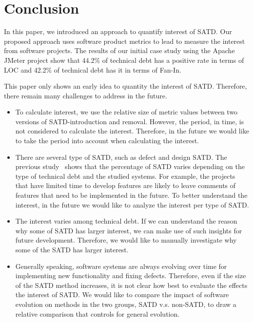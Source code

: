 \section{Conclusion} \label{conclusion}
%
In this paper, we introduced an approach to quantify interest of SATD. Our proposed approach uses
software product metrics to lead to measure the interest from software projects. The results of our initial case study using the Apache JMeter project
show that 44.2\% of technical debt has a positive rate in terms of LOC and 42.2\% of technical debt has it in terms of Fan-In.

 This paper only shows an early idea to quantity the interest of SATD. Therefore, there remain
many challenges to address in the future. 

\begin{itemize}
\item To calculate interest, we use the relative size of metric values between two versions of SATD-introduction and removal. However, the period, in time, is not considered to calculate the interest. Therefore, in the future we would like to take the period into account when calculating the interest.
\item  There are several type of SATD, such as defect and design SATD.
The previous study~\cite{Maldonado2015MTD} shows that the percentage of SATD varies depending on the type of technical debt and the studied systems. For example, the projects that have limited time to develop features are likely to leave comments of features that need to be implemented in the future. 
To better understand the interest, in the future we would like to analyze the interest per type of SATD.
\item  The interest varies among technical debt. If we can understand the reason why some of SATD has larger interest, we can make use of such insights for future development. Therefore, we would like to manually investigate why some of the SATD has larger interest.
\item Generally speaking, software systems are always evolving over time for implementing new functionality and fixing defects.
Therefore, even if the size of the SATD method increases, it is not clear how best to evaluate the effects the interest of SATD.
We would like to compare the impact of software evolution on methods in the two groups, SATD v.s. non-SATD, to draw a relative comparison that controls for general evolution.
\end{itemize}
